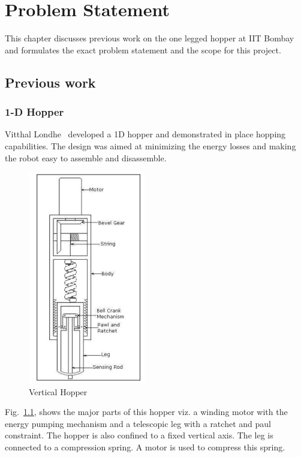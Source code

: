 \chapter{Problem Statement}
\label{chap:problem}
This chapter discusses previous work on the one legged hopper at IIT Bombay and formulates the exact problem statement and the scope 
for this project.

\section{Previous work}
\subsection{1-D Hopper}
Vitthal Londhe~\cite{londhe} developed a 1D hopper and demonstrated in place hopping capabilities. The design was aimed at minimizing
the energy losses and making the robot easy to assemble and disassemble.
\begin{figure}
\centering
\includegraphics[scale =1.5]{fig/londhe.pdf}
\caption[Vertical Hopper]{Vertical Hopper \cite{londhe}}
\label{fig:2_londhe}
\end{figure}
Fig.~\ref{fig:2_londhe}, shows the major parts of this hopper viz. a winding motor with the energy pumping mechanism and a telescopic 
leg with a ratchet and paul constraint. The hopper is also confined to a fixed vertical axis. The leg is connected to a compression 
spring. A motor is used to compress this spring.\\

